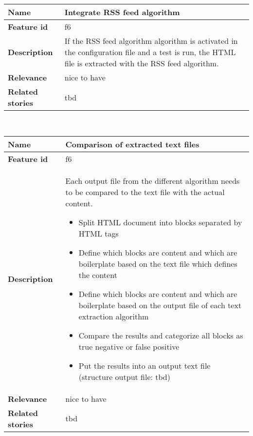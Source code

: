 \begin{tabular}{ | p{3cm} | p{12cm} |}
	\hline
	\textbf{Name} 				& Integrate RSS feed algorithm \\ \hline
	\textbf{Feature id} 		& f6 \\ \hline
	\textbf{Description} 		& If the RSS feed algorithm algorithm is activated in the configuration file and a test is run, the HTML file is extracted with the RSS feed algorithm. \\ \hline
	\textbf{Relevance} 			& nice to have\\ \hline
	\textbf{Related stories} 	& tbd \\ \hline
	\end{tabular} \\

	\begin{tabular}{ | p{3cm} | p{12cm} |}
	\hline
	\textbf{Name} 				& Comparison of extracted text files \\ \hline
	\textbf{Feature id} 		& f6 \\ \hline
	\textbf{Description} 		& Each output file from the different algorithm needs to be compared to the text file with the actual content.
								\begin{itemize}
							        \item Split HTML document into blocks separated by HTML tags
							        \item Define which blocks are content and which are boilerplate based on the text file which defines the content
							        \item Define which blocks are content and which are boilerplate based on the output file of each text extraction algorithm
							        \item Compare the results and categorize all blocks as true negative or false positive
							        \item Put the results into an output text file (structure output file: tbd)
						        \end{itemize}
								\\ \hline
	\textbf{Relevance} 			& nice to have\\ \hline
	\textbf{Related stories} 	& tbd \\ \hline
	\end{tabular} \\



